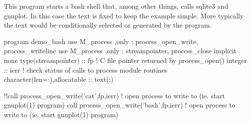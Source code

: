 This program starts a bash shell that, among other things, calls sqlite3 and gnuplot. In this case the text is fixed to keep the example simple. More typically the text would be conditionally selected or generated by the program. \begin{DoxyVerb}program demo_bash
use M_process ,only : process_open_write, process_writeline
use M_process ,only : streampointer, process_close
implicit none
type(streampointer) :: fp                     ! C file pointer returned by process_open()
integer :: ierr                               ! check status of calls to process module routines
character(len=:),allocatable :: text(:)

 !!call process_open_write('cat',fp,ierr)       ! open process to write to (ie. start gnuplot(1) program)
   call process_open_write('bash',fp,ierr)       ! open process to write to (ie. start gnuplot(1) program)


\end{DoxyVerb}
